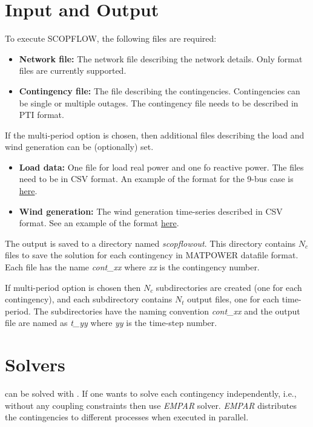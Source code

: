 \section{Input and Output}
To execute SCOPFLOW, the following files are required:
\begin{itemize}
    \item \textbf{Network file:} The network file describing the network details. Only \matpower format files are currently supported.
    \item \textbf{Contingency file:} The file describing the contingencies. Contingencies can be single or multiple outages. The contingency file needs to be described in PTI format.
\end{itemize}
If the multi-period option is chosen, then additional files describing the load and wind generation can be (optionally) set.
\begin{itemize}
    \item \textbf{Load data:} One file for load real power and one fo reactive power. The files need to be in CSV format. An example of the format for the 9-bus case is \href{https://gitlab.pnnl.gov/exasgd/frameworks/exago/-/tree/master/datafiles/case9}{here}.
    \item \textbf{Wind generation:} The wind generation time-series described in CSV format. See an example of the format \href{https://gitlab.pnnl.gov/exasgd/frameworks/exago/-/tree/master/datafiles/case9}{here}.
\end{itemize}

The \scopflow output is saved to a directory named \emph{scopflowout}. This directory contains $N_c$ files to save the solution for each contingency in MATPOWER datafile format. Each file has the name \emph{cont_xx} where \emph{xx} is the contingency number. 

If multi-period option is chosen then $N_c$ subdirectories are created (one for each contingency), and each subdirectory contains $N_t$ output files, one for each time-period. The subdirectories have the naming convention \emph{cont_xx} and the output file are named as \emph{t_yy} where \emph{yy} is the time-step number.


\section{Solvers}
\scopflow can be solved with \ipopt. If one wants to solve each contingency independently, i.e., without any coupling constraints then use \emph{EMPAR} solver. \emph{EMPAR} distributes the contingencies to different processes when executed in parallel.

